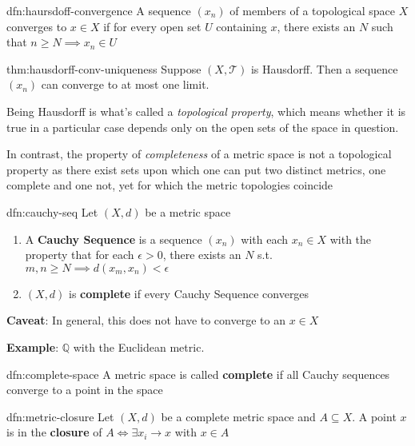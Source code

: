 \documentclass{article}
\begin{document}
\begin{dfn}{dfn:haursdoff-convergence}{}
    A sequence $(x_{n})$ of members of a topological space $X$ converges to $x\in X$ if for every open set $U$ containing $x$, there exists an $N$ such that $n\ge N \implies x_{n}\in U$
\end{dfn}

\begin{thm}{thm:hausdorff-conv-uniqueness}{}
    Suppose $(X, \mathcal{T})$ is Hausdorff. Then a sequence $(x_{n})$ can converge to at most one limit.
\end{thm}

Being Hausdorff is what's called a \textit{topological property}, which means whether it is true in a particular case depends only on the open sets of the space in question.

In contrast, the property of \textit{completeness} of a metric space is not a topological property as there exist sets upon which one can put two distinct metrics, one complete and one not, yet for which the metric topologies coincide

\newpage
\begin{dfn}{dfn:cauchy-seq}{}
    Let $(X, d)$ be a metric space
    \begin{enumerate}
        \item A \textbf{Cauchy Sequence} is a sequence $(x_{n})$ with each $x_{n}\in X$ with the property that for each $\epsilon > 0$, there exists an $N$ s.t. $m,n\ge N \implies d(x_{m}, x_{n}) < \epsilon$
        \item $(X, d)$ is \textbf{complete} if every Cauchy Sequence converges
    \end{enumerate}
\end{dfn}

\textbf{Caveat}: In general, this does not have to converge to an $x\in X$

\textbf{Example}: $\mathbb{Q}$ with the Euclidean metric. 

\begin{dfn}{dfn:complete-space}{}
    A metric space is called \textbf{complete} if all Cauchy sequences converge to a point in the space
\end{dfn}

\begin{dfn}{dfn:metric-closure}{}
    Let $(X, d)$ be a complete metric space and $A \subseteq X$. A point $x$ is in the \textbf{closure} of $A \iff \exists x_{i} \to x$ with $x\in A$
\end{dfn}
\end{document}
